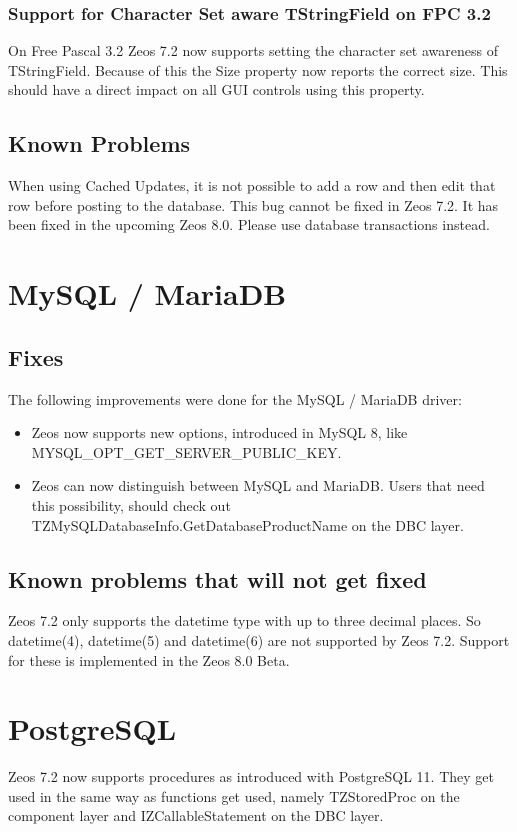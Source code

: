 \documentclass[a4paper,12pt,oneside]{book}
\begin{document}
\subsubsection{Support for Character Set aware TStringField on FPC 3.2}
\label{sec:Rev8_General_Features_TSTringField}
On Free Pascal 3.2 Zeos 7.2 now supports setting the character set awareness of TStringField.
Because of this the Size property now reports the correct size.
This should have a direct impact on all GUI controls using this property.

\subsection{Known Problems}
When using Cached Updates, it is not possible to add a row and then edit that row before posting to the database.
This bug cannot be fixed in Zeos 7.2.
It has been fixed in the upcoming Zeos 8.0.
Please use database transactions instead.

\section{MySQL / MariaDB}
\subsection{Fixes}
The following improvements were done for the MySQL / MariaDB driver:
\begin{itemize}
\item Zeos now supports new options, introduced in MySQL 8, like MYSQL\_\-OPT\_\-GET\_\-SERVER\_\-PUBLIC\_\-KEY.
\item Zeos can now distinguish between MySQL and MariaDB. Users that need this possibility, should check out TZMySQL\-Database\-Info.\-Get\-Database\-Product\-Name on the DBC layer.
\end{itemize}

\subsection{Known problems that will not get fixed}
Zeos 7.2 only supports the datetime type with up to three decimal places.
So datetime(4), datetime(5) and datetime(6) are not supported by Zeos 7.2.
Support for these is implemented in the Zeos 8.0 Beta.

\section{PostgreSQL}
Zeos 7.2 now supports procedures as introduced with PostgreSQL 11.
They get used in the same way as functions get used, namely TZStoredProc on the component layer and IZCallableStatement on the DBC layer.
\end{document}
